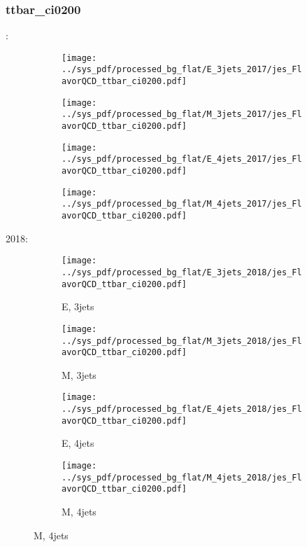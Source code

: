 \documentclass{beamer}
\begin{document}
\begin{frame}
\frametitle{ttbar_ci0200}
\fontsize{5}{1}:
\begin{figure}
\centering
\begin{subfigure}[b]{0.24\textwidth}
\texttt{[image: ../sys\_pdf/processed\_bg\_flat/E\_3jets\_2017/jes\_FlavorQCD\_ttbar\_ci0200.pdf]}
\end{subfigure}
\begin{subfigure}[b]{0.24\textwidth}
\texttt{[image: ../sys\_pdf/processed\_bg\_flat/M\_3jets\_2017/jes\_FlavorQCD\_ttbar\_ci0200.pdf]}
\end{subfigure}
\begin{subfigure}[b]{0.24\textwidth}
\texttt{[image: ../sys\_pdf/processed\_bg\_flat/E\_4jets\_2017/jes\_FlavorQCD\_ttbar\_ci0200.pdf]}
\end{subfigure}
\begin{subfigure}[b]{0.24\textwidth}
\texttt{[image: ../sys\_pdf/processed\_bg\_flat/M\_4jets\_2017/jes\_FlavorQCD\_ttbar\_ci0200.pdf]}
\end{subfigure}
\end{figure}
2018:
\begin{figure}
\centering
\begin{subfigure}[b]{0.24\textwidth}
\texttt{[image: ../sys\_pdf/processed\_bg\_flat/E\_3jets\_2018/jes\_FlavorQCD\_ttbar\_ci0200.pdf]}
\captionsetup{font=tiny}
\caption{E, 3jets}
\end{subfigure}
\begin{subfigure}[b]{0.24\textwidth}
\texttt{[image: ../sys\_pdf/processed\_bg\_flat/M\_3jets\_2018/jes\_FlavorQCD\_ttbar\_ci0200.pdf]}
\captionsetup{font=tiny}
\caption{M, 3jets}
\end{subfigure}
\begin{subfigure}[b]{0.24\textwidth}
\texttt{[image: ../sys\_pdf/processed\_bg\_flat/E\_4jets\_2018/jes\_FlavorQCD\_ttbar\_ci0200.pdf]}
\captionsetup{font=tiny}
\caption{E, 4jets}
\end{subfigure}
\begin{subfigure}[b]{0.24\textwidth}
\texttt{[image: ../sys\_pdf/processed\_bg\_flat/M\_4jets\_2018/jes\_FlavorQCD\_ttbar\_ci0200.pdf]}
\captionsetup{font=tiny}
\caption{M, 4jets}
\end{subfigure}
\end{figure}
\end{frame}
\end{document}

